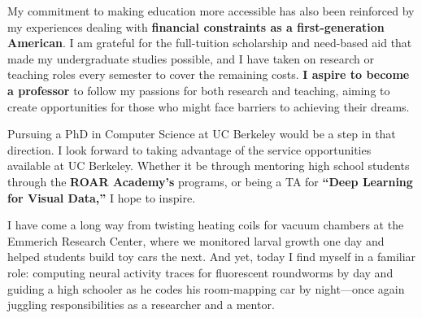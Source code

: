 \documentclass[letterpaper,11pt]{article}
\begin{document}
My commitment to making education more accessible has also been reinforced by my experiences dealing with \textbf{financial constraints as a first-generation American}. I am grateful for the full-tuition scholarship and need-based aid that made my undergraduate studies possible, and I have taken on research or teaching roles every semester to cover the remaining costs. \textbf{I aspire to become a professor} to follow my passions for both research and teaching, aiming to create opportunities for those who might face barriers to achieving their dreams.

Pursuing a PhD in Computer Science at UC Berkeley would be a step in that direction. I look forward to taking advantage of the service opportunities available at UC Berkeley. Whether it be through mentoring high school students through the \textbf{ROAR Academy’s} programs, or being a TA for \textbf{“Deep Learning for Visual Data,”} I hope to inspire.

I have come a long way from twisting heating coils for vacuum chambers at the Emmerich Research Center, where we monitored larval growth one day and helped students build toy cars the next. And yet, today I find myself in a familiar role: computing neural activity traces for fluorescent roundworms by day and guiding a high schooler as he codes his room-mapping car by night---once again juggling responsibilities as a researcher and a mentor.
\end{document}
